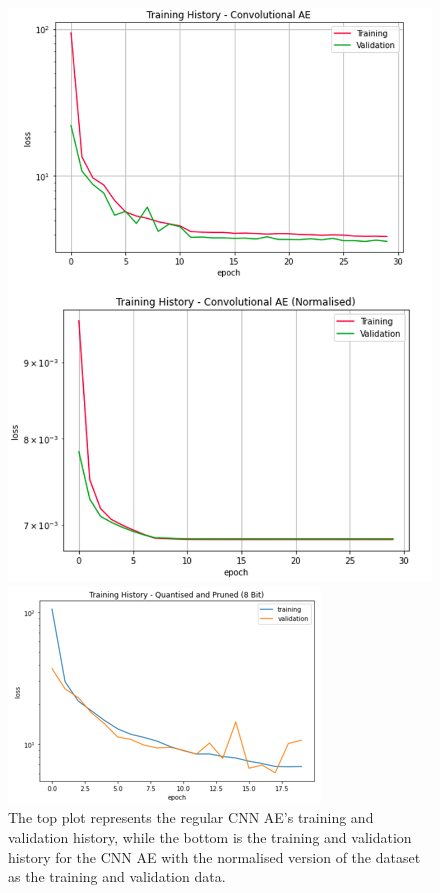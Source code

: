 \documentclass[a4paper]{article}
\theoremstyle{plain}
\theoremstyle{definition}
\begin{document}
			\begin{figure}[H]
				\centering
				\begin{minipage}[c]{0.45\linewidth}
					\centering
					\includegraphics[width=\textwidth]{cnn-training.png}
					\caption{The top plot represents the regular CNN AE's training and validation history, while the bottom is the training and validation history for the CNN AE with the normalised version of the dataset as the training and validation data.}
					\label{fig:cnn-training}
				\end{minipage}
				\hfill
				\begin{minipage}[c]{0.45\linewidth}
					\centering
					\includegraphics[width=\textwidth]{cnn-compressed-training.png}

\end{minipage}
\end{figure}
\end{document}
